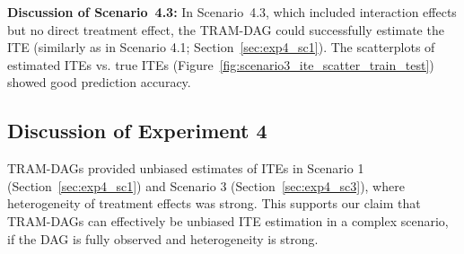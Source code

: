 \FloatBarrier


\textbf{Discussion of Scenario~4.3:} In Scenario~4.3, which included interaction effects but no direct treatment effect, the TRAM-DAG could successfully estimate the ITE (similarly as in Scenario 4.1; Section~\ref{sec:exp4_sc1}). The scatterplots of estimated ITEs vs. true ITEs (Figure~\ref{fig:scenario3_ite_scatter_train_test}) showed good prediction accuracy.














\FloatBarrier


\subsection{Discussion of Experiment 4} \label{sec:disc_experiment4}


TRAM-DAGs provided unbiased estimates of ITEs in Scenario 1 (Section~\ref{sec:exp4_sc1}) and Scenario 3 (Section~\ref{sec:exp4_sc3}), where heterogeneity of treatment effects was strong. This supports our claim that TRAM-DAGs can effectively be unbiased ITE estimation in a complex scenario, if the DAG is fully observed and heterogeneity is strong.



